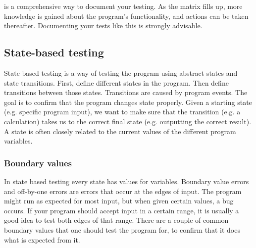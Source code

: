 \documentclass[11pt,a4paper,twoside]{article}
\begin{document}
 is a comprehensive way to document your testing. As the matrix
fills up, more knowledge is gained about the program's functionality, and
actions can be taken thereafter. Documenting your tests like this is strongly
advisable.
 

\subsection{State-based testing}

State-based testing is a way of testing the program using abstract states and
state transitions. First, define different states in the program. Then define
transitions between those states. Transitions are caused by program events. The
goal is to confirm that the program changes state properly. Given a starting
state (e.g. specific program input), we want to make sure that the transition
(e.g. a calculation) takes us to the correct final state (e.g. outputting the
correct result). A state is often closely related to the current values of the
different program variables.
 

\subsubsection{Boundary values}

In state based testing every state has values for variables. Boundary value
errors and off-by-one errors are errors that occur at the edges of input. The
program might run as expected for most input, but when given certain values, a
bug occurs. If your program should accept input in a certain range, it is
usually a good idea to test both edges of that range. There are a couple of
common boundary values that one should test the program for, to confirm that it
does what is expected from it.
\end{document}
